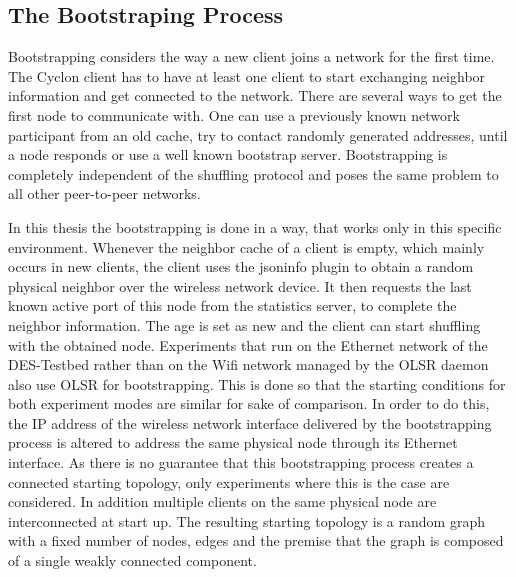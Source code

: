 \subsection{The Bootstraping Process}
Bootstrapping considers the way a new client joins a network for the first time.
The Cyclon client has to have at least one client to start exchanging neighbor
information and get connected to the network. There are several ways to get the
first node to communicate with. One can use a previously known network
participant from an old cache, try to contact randomly generated addresses,
until a node responds or use a well known bootstrap server. Bootstrapping is
completely independent of the shuffling protocol and poses the same problem to
all other peer-to-peer networks.

In this thesis the bootstrapping is done in a way, that works only in this
specific environment. Whenever the neighbor cache of a client is empty, which
mainly occurs in new clients, the client uses the jsoninfo plugin to obtain a
random physical neighbor over the wireless network device. It then requests the
last known active port of this node from the statistics server, to complete the
neighbor information. The age is set as new and the client can start shuffling
with the obtained node. Experiments that run on the Ethernet network of the
DES-Testbed rather than on the Wifi network managed by the OLSR daemon also use
OLSR for bootstrapping. This is done so that the starting conditions for both
experiment modes are similar for sake of comparison. In order to do this, the
IP address of the wireless network interface delivered by the bootstrapping
process is altered to address the same physical node through its Ethernet
interface. As there is no guarantee that this bootstrapping process creates a
connected starting topology, only experiments where this is the case are
considered. In addition multiple clients on the same physical node are
interconnected at start up. The resulting starting topology is a random graph
with a fixed number of nodes, edges and the premise that the graph is composed
of a single weakly connected component.

